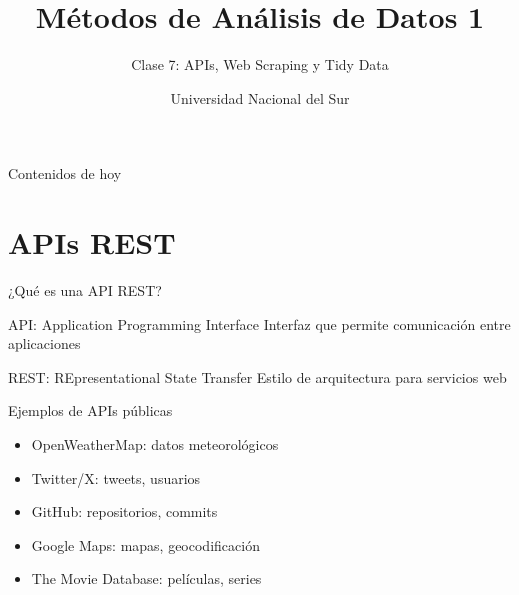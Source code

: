 \documentclass[aspectratio=169]{beamer}
\title{Métodos de Análisis de Datos 1}
\subtitle{Clase 7: APIs, Web Scraping y Tidy Data}
\author{Universidad Nacional del Sur}
\date{}
\begin{document}
\begin{frame}
\titlepage
\end{frame}

\begin{frame}{Contenidos de hoy}
\tableofcontents
\end{frame}

\section{APIs REST}

\begin{frame}{¿Qué es una API REST?}
\begin{block}{API: Application Programming Interface}
Interfaz que permite comunicación entre aplicaciones
\end{block}

\begin{block}{REST: REpresentational State Transfer}
Estilo de arquitectura para servicios web
\end{block}

\pause

\begin{exampleblock}{Ejemplos de APIs públicas}
\begin{itemize}
    \item OpenWeatherMap: datos meteorológicos
    \item Twitter/X: tweets, usuarios
    \item GitHub: repositorios, commits
    \item Google Maps: mapas, geocodificación
    \item The Movie Database: películas, series
\end{itemize}
\end{exampleblock}
\end{frame}
\end{document}
